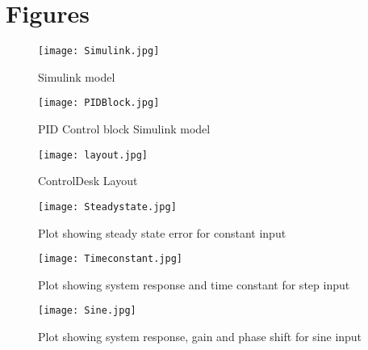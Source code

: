 \documentclass{article}
\begin{document}
\section{Figures}
\label{sec:fig} 
\FloatBarrier
\begin{figure}
\centering
\texttt{[image: Simulink.jpg]}
\caption{Simulink model}
\label{fig:sim}
\end{figure}

\begin{figure}
\centering
\texttt{[image: PIDBlock.jpg]}
\caption{PID Control block Simulink model}
\label{fig:pid}
\end{figure}

\begin{figure}
\centering
\texttt{[image: layout.jpg]}
\caption{ControlDesk Layout}
\label{fig:controldesk}
\end{figure}

\begin{figure}
\centering
\texttt{[image: Steadystate.jpg]}
\caption{Plot showing steady state error for constant input}
\label{fig:ss}
\end{figure}

\begin{figure}
\centering 
\texttt{[image: Timeconstant.jpg]}
\caption{Plot showing system response and time constant for step input}
\label{fig:tc}
\end{figure}

\begin{figure}
\centering 
\texttt{[image: Sine.jpg]}
\caption{Plot showing system response, gain and phase shift for sine input}
\label{fig:sine}
\end{figure}
\end{document}
